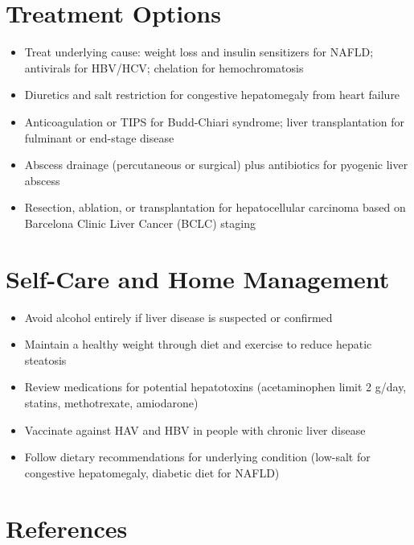 \section*{Treatment Options}
\begin{itemize}
  \item Treat underlying cause: weight loss and insulin sensitizers for NAFLD; antivirals for HBV/HCV; chelation for hemochromatosis
  \item Diuretics and salt restriction for congestive hepatomegaly from heart failure
  \item Anticoagulation or TIPS for Budd-Chiari syndrome; liver transplantation for fulminant or end-stage disease
  \item Abscess drainage (percutaneous or surgical) plus antibiotics for pyogenic liver abscess
  \item Resection, ablation, or transplantation for hepatocellular carcinoma based on Barcelona Clinic Liver Cancer (BCLC) staging
\end{itemize}

\section*{Self-Care and Home Management}
\begin{itemize}
  \item Avoid alcohol entirely if liver disease is suspected or confirmed
  \item Maintain a healthy weight through diet and exercise to reduce hepatic steatosis
  \item Review medications for potential hepatotoxins (acetaminophen limit 2 g/day, statins, methotrexate, amiodarone)
  \item Vaccinate against HAV and HBV in people with chronic liver disease
  \item Follow dietary recommendations for underlying condition (low-salt for congestive hepatomegaly, diabetic diet for NAFLD)
\end{itemize}

\section*{References}


